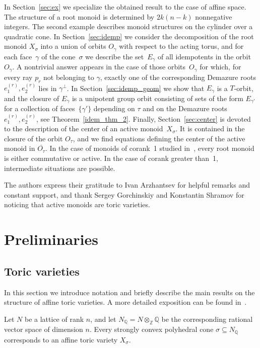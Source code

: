 \documentclass[a4paper, 11pt]{amsart}
\theoremstyle{plain}
\theoremstyle{remark}
\theoremstyle{definition}
\newcommand{\ol}[1]{\overline{#1}}
\begin{document}
In Section~\ref{sec:ex} we specialize the obtained result to the case of affine space. The structure of a root monoid is determined by $2k(n-k)$ nonnegative integers. The second example describes monoid structures on the cylinder over a quadratic cone. 
In Section~\ref{sec:idemp} we consider the decomposition of the root monoid $X_\sigma$ into a union of orbits $O_\gamma$ with respect to the acting torus, and for each face~$\gamma$ of the cone~$\sigma$ we describe the set~$E_\gamma$ of all idempotents in the orbit $O_\gamma$. A nontrivial answer appears in the case of those orbits~$O_\gamma$ for which, for every ray $p_r$ not belonging to $\gamma$, exactly one of the corresponding Demazure roots $e_1^{(r)}, e_2^{(r)}$ lies in $\gamma^\perp$.
In Section~\ref{sec:idemp_geom} we show that $E_\gamma$ is a $T$-orbit, and the closure of $E_\gamma$ is a unipotent group orbit consisting of sets of the form $E_{\gamma'}$ for a collection of faces~$\{\gamma'\}$ depending on $\tau$ and on the Demazure roots~$e_1^{(r)}, e_2^{(r)}$, see Theorem~\ref{idem_thm_2}.
Finally, Section~\ref{sec:center} is devoted to the description of the center of an active monoid~$X_\sigma$. It is contained in the closure of the orbit $O_\tau$, and we find equations defining the center of the active monoid in $\ol{O_\tau}$. In the case of monoids of corank~1 studied in~\cite{YZ}, every root monoid is either commutative or active. In the case of corank greater than~1, intermediate situations are possible. 

The authors express their gratitude to Ivan Arzhantsev for helpful remarks and constant support, and thank Sergey Gorchinskiy and Konstantin Shramov for noticing that active monoids are toric varieties.

\section{Preliminaries}
\subsection{Toric varieties}\label{sec:tor}
In this section we introduce notation and briefly describe the main results on the structure of affine toric varieties. A more detailed exposition can be found in~\cite{F}.

Let $N$ be a lattice of rank $n$, and let $N_{\mathbb{Q}} = N \otimes_{\mathbb{Z}} \mathbb{Q}$ be the corresponding rational vector space of dimension $n$. Every strongly convex polyhedral cone $\sigma \subseteq N_{\mathbb{Q}}$ corresponds to an affine toric variety $X_\sigma$.
\end{document}
